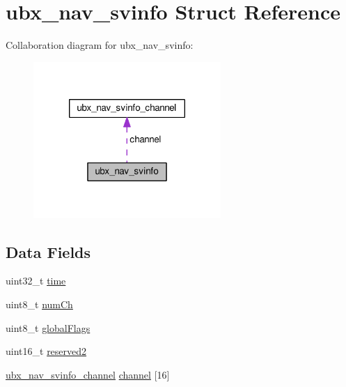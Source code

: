 \hypertarget{structubx__nav__svinfo}{\section{ubx\+\_\+nav\+\_\+svinfo Struct Reference}
\label{structubx__nav__svinfo}
}


Collaboration diagram for ubx\+\_\+nav\+\_\+svinfo\+:\nopagebreak
\begin{figure}[H]
\begin{center}
\leavevmode
\includegraphics[width=202pt]{structubx__nav__svinfo__coll__graph}
\end{center}
\end{figure}
\subsection*{Data Fields}
\begin{DoxyCompactItemize}
\item 
uint32\+\_\+t \hyperlink{structubx__nav__svinfo_a0545f2cf7eaaea1cdf38b0d8a258ffc3}{time}
\item 
uint8\+\_\+t \hyperlink{structubx__nav__svinfo_a75fc6e5cdb6c25fa8f1377ef1a6ce368}{num\+Ch}
\item 
uint8\+\_\+t \hyperlink{structubx__nav__svinfo_aa652a5b380bd8a87b227805e49011ad6}{global\+Flags}
\item 
uint16\+\_\+t \hyperlink{structubx__nav__svinfo_a6088c94b5f1c36a61cee6538062ac777}{reserved2}
\item 
\hyperlink{structubx__nav__svinfo__channel}{ubx\+\_\+nav\+\_\+svinfo\+\_\+channel} \hyperlink{structubx__nav__svinfo_ad1bf44bc36a093bce95c4581c595fe7b}{channel} \mbox{[}16\mbox{]}
\end{DoxyCompactItemize}



